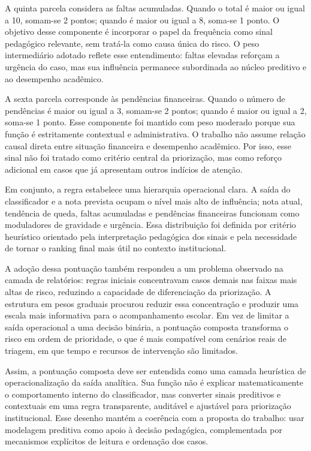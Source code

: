 A quinta parcela considera as faltas acumuladas. Quando o total \'e maior ou igual a 10, somam-se 2 pontos; quando \'e maior ou igual a 8, soma-se 1 ponto. O objetivo desse componente \'e incorporar o papel da frequ\^encia como sinal pedag\'ogico relevante, sem trat\'a-la como causa \'unica do risco. O peso intermedi\'ario adotado reflete esse entendimento: faltas elevadas refor\c{c}am a urg\^encia do caso, mas sua influ\^encia permanece subordinada ao n\'ucleo preditivo e ao desempenho acad\^emico.

A sexta parcela corresponde \`as pend\^encias financeiras. Quando o n\'umero de pend\^encias \'e maior ou igual a 3, somam-se 2 pontos; quando \'e maior ou igual a 2, soma-se 1 ponto. Esse componente foi mantido com peso moderado porque sua fun\c{c}\~ao \'e estritamente contextual e administrativa. O trabalho n\~ao assume rela\c{c}\~ao causal direta entre situa\c{c}\~ao financeira e desempenho acad\^emico. Por isso, esse sinal n\~ao foi tratado como crit\'erio central da prioriza\c{c}\~ao, mas como refor\c{c}o adicional em casos que j\'a apresentam outros ind\'icios de aten\c{c}\~ao.

Em conjunto, a regra estabelece uma hierarquia operacional clara. A sa\'ida do classificador e a nota prevista ocupam o n\'ivel mais alto de influ\^encia; nota atual, tend\^encia de queda, faltas acumuladas e pend\^encias financeiras funcionam como moduladores de gravidade e urg\^encia. Essa distribui\c{c}\~ao foi definida por crit\'erio heur\'istico orientado pela interpreta\c{c}\~ao pedag\'ogica dos sinais e pela necessidade de tornar o ranking final mais \'util no contexto institucional.

A ado\c{c}\~ao dessa pontua\c{c}\~ao tamb\'em respondeu a um problema observado na camada de relat\'orios: regras iniciais concentravam casos demais nas faixas mais altas de risco, reduzindo a capacidade de diferencia\c{c}\~ao da prioriza\c{c}\~ao. A estrutura em pesos graduais procurou reduzir essa concentra\c{c}\~ao e produzir uma escala mais informativa para o acompanhamento escolar. Em vez de limitar a sa\'ida operacional a uma decis\~ao bin\'aria, a pontua\c{c}\~ao composta transforma o risco em ordem de prioridade, o que \'e mais compat\'ivel com cen\'arios reais de triagem, em que tempo e recursos de interven\c{c}\~ao s\~ao limitados.

Assim, a pontua\c{c}\~ao composta deve ser entendida como uma camada heur\'istica de operacionaliza\c{c}\~ao da sa\'ida anal\'itica. Sua fun\c{c}\~ao n\~ao \'e explicar matematicamente o comportamento interno do classificador, mas converter sinais preditivos e contextuais em uma regra transparente, audit\'avel e ajust\'avel para prioriza\c{c}\~ao institucional. Esse desenho mant\'em a coer\^encia com a proposta do trabalho: usar modelagem preditiva como apoio \`a decis\~ao pedag\'ogica, complementada por mecanismos expl\'icitos de leitura e ordena\c{c}\~ao dos casos.

